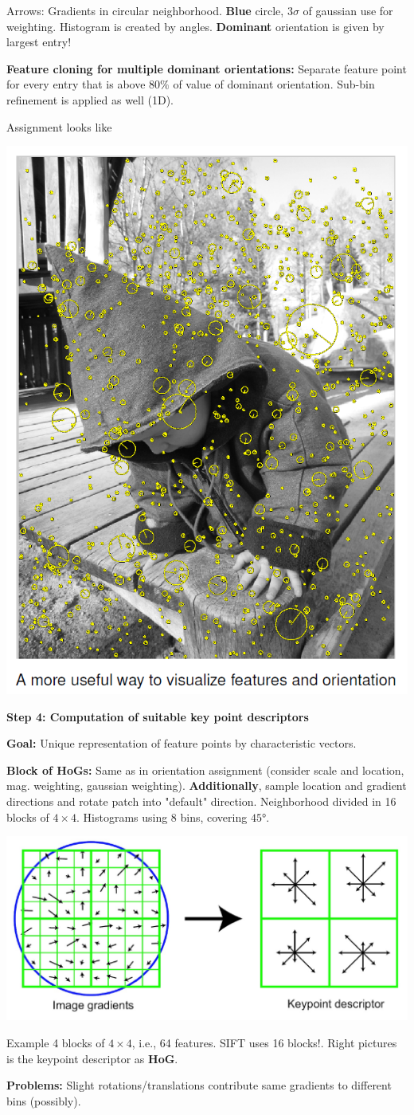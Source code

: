 Arrows: Gradients in circular neighborhood. \textbf{Blue} circle, $3\sigma$ of gaussian use for weighting. Histogram is created by angles. \textbf{Dominant} orientation is given by largest entry!

\textbf{Feature cloning for multiple dominant orientations:} Separate feature point for every entry that is above $80\%$ of value of dominant orientation. Sub-bin refinement is applied as well (1D).

Assignment looks like

\includegraphics[width=.4\textwidth]{images/chap5/ori_asg}

\textbf{Step 4: Computation of suitable key point descriptors}

\textbf{Goal:} Unique representation of feature points by characteristic vectors.

\textbf{Block of HoGs:} Same as in orientation assignment (consider scale and location, mag. weighting, gaussian weighting). \textbf{Additionally}, sample location and gradient directions and rotate patch into "default" direction. Neighborhood divided in 16 blocks of $4\times 4$. Histograms using 8 bins, covering $45°$.

\includegraphics[width=.6\textwidth]{images/chap5/block_hog}

Example 4 blocks of $4\times 4$, i.e., 64 features. SIFT uses 16 blocks!. Right pictures is the keypoint descriptor as \textbf{HoG}.

\textbf{Problems:} Slight rotations/translations contribute same gradients to different bins (possibly).

